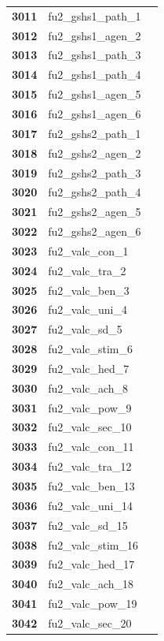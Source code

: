 \documentclass[
  letterpaper,
  DIV=11,
  numbers=noendperiod]{scrartcl}
\begin{document}
\begin{longtable}[t]{>{}cll}
\addlinespace
\textbf{3011} & fu2\_gshs1\_path\_1 & \\
\textbf{3012} & fu2\_gshs1\_agen\_2 & \\
\textbf{3013} & fu2\_gshs1\_path\_3 & \\
\textbf{3014} & fu2\_gshs1\_path\_4 & \\
\textbf{3015} & fu2\_gshs1\_agen\_5 & \\
\addlinespace
\textbf{3016} & fu2\_gshs1\_agen\_6 & \\
\textbf{3017} & fu2\_gshs2\_path\_1 & \\
\textbf{3018} & fu2\_gshs2\_agen\_2 & \\
\textbf{3019} & fu2\_gshs2\_path\_3 & \\
\textbf{3020} & fu2\_gshs2\_path\_4 & \\
\addlinespace
\textbf{3021} & fu2\_gshs2\_agen\_5 & \\
\textbf{3022} & fu2\_gshs2\_agen\_6 & \\
\textbf{3023} & fu2\_valc\_con\_1 & \\
\textbf{3024} & fu2\_valc\_tra\_2 & \\
\textbf{3025} & fu2\_valc\_ben\_3 & \\
\addlinespace
\textbf{3026} & fu2\_valc\_uni\_4 & \\
\textbf{3027} & fu2\_valc\_sd\_5 & \\
\textbf{3028} & fu2\_valc\_stim\_6 & \\
\textbf{3029} & fu2\_valc\_hed\_7 & \\
\textbf{3030} & fu2\_valc\_ach\_8 & \\
\addlinespace
\textbf{3031} & fu2\_valc\_pow\_9 & \\
\textbf{3032} & fu2\_valc\_sec\_10 & \\
\textbf{3033} & fu2\_valc\_con\_11 & \\
\textbf{3034} & fu2\_valc\_tra\_12 & \\
\textbf{3035} & fu2\_valc\_ben\_13 & \\
\addlinespace
\textbf{3036} & fu2\_valc\_uni\_14 & \\
\textbf{3037} & fu2\_valc\_sd\_15 & \\
\textbf{3038} & fu2\_valc\_stim\_16 & \\
\textbf{3039} & fu2\_valc\_hed\_17 & \\
\textbf{3040} & fu2\_valc\_ach\_18 & \\
\addlinespace
\textbf{3041} & fu2\_valc\_pow\_19 & \\
\textbf{3042} & fu2\_valc\_sec\_20 & \\

\end{longtable}
\end{document}
